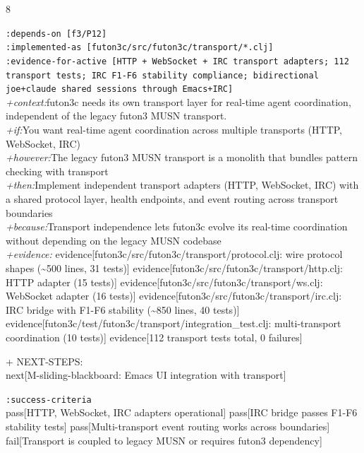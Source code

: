 \documentclass[landscape]{article}
\newcommand{\flexitag}[1]{\textcolor[gray]{0.35}{\textit{#1}}}
\newenvironment{devmapactive}{%
  \def\FrameCommand{\colorbox{devmapactivebg}}%
  \setlength{\fboxsep}{2pt}%
  \MakeFramed{\advance\hsize-\width \FrameRestore}%
}{\endMakeFramed}
\begin{document}
\begin{paracol}{8}
\begin{devmapactive}
  \texttt{:\allowbreak{}depends-\allowbreak{}on [f3/\allowbreak{}P12]}\\
  \texttt{:\allowbreak{}implemented-\allowbreak{}as [futon3c/\allowbreak{}src/\allowbreak{}futon3c/\allowbreak{}transport/\allowbreak{}*.clj]}\\
  \texttt{:\allowbreak{}evidence-\allowbreak{}for-\allowbreak{}active [HTTP +\allowbreak{} WebSocket +\allowbreak{} IRC transport adapters;\allowbreak{} 112 transport tests;\allowbreak{} IRC F1-\allowbreak{}F6 stability compliance;\allowbreak{} bidirectional joe+\allowbreak{}claude shared sessions through Emacs+\allowbreak{}IRC]}\\
  \flexitag{+context:}futon3c needs its own transport layer for real-time agent coordination, independent of the legacy futon3 MUSN transport.\\
  \flexitag{+if:}You want real-time agent coordination across multiple transports (HTTP, WebSocket, IRC)\\
  \flexitag{+however:}The legacy futon3 MUSN transport is a monolith that bundles pattern checking with transport\\
  \flexitag{+then:}Implement independent transport adapters (HTTP, WebSocket, IRC) with a shared protocol layer, health endpoints, and event routing across transport boundaries\\
  \flexitag{+because:}Transport independence lets futon3c evolve its real-time coordination without depending on the legacy MUSN codebase\\
  \flexitag{+evidence:} evidence[futon3c/src/futon3c/transport/protocol.clj: wire protocol shapes (\textasciitilde{}500 lines, 31 tests)] evidence[futon3c/src/futon3c/transport/http.clj: HTTP adapter (15 tests)] evidence[futon3c/src/futon3c/transport/ws.clj: WebSocket adapter (16 tests)] evidence[futon3c/src/futon3c/transport/irc.clj: IRC bridge with F1-F6 stability (\textasciitilde{}850 lines, 40 tests)] evidence[futon3c/test/futon3c/transport/integration\_test.clj: multi-transport coordination (10 tests)] evidence[112 transport tests total, 0 failures]\\
\par
  + NEXT-STEPS:\\
    next[M-sliding-blackboard: Emacs UI integration with transport]\\
\par
  \texttt{:\allowbreak{}success-\allowbreak{}criteria}\\
    pass[HTTP, WebSocket, IRC adapters operational] pass[IRC bridge passes F1-F6 stability tests] pass[Multi-transport event routing works across boundaries] fail[Transport is coupled to legacy MUSN or requires futon3 dependency]\\

\end{devmapactive}
\end{paracol}
\end{document}
